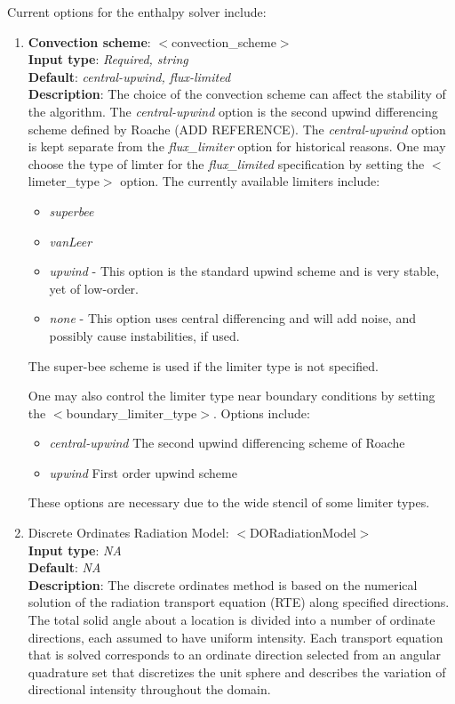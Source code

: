 Current options for the enthalpy solver include:
\begin{enumerate}
%
\item {\bf Convection scheme}: $<$convection\_scheme$>$ \\
{\bf Input type}: {\it Required, string} \\
{\bf Default}: {\it central-upwind, flux-limited } \\ 
{\bf Description}: The choice of the convection scheme can affect the stability of the algorithm.  The {\it central-upwind} option is the second upwind differencing scheme defined by Roache (ADD REFERENCE).  The {\it central-upwind} option is kept separate from the {\it flux\_limiter} option for historical reasons.  One may choose the type of limter for the {\it flux\_limited} specification by setting the  $<$limeter\_type$>$ option.  The currently available limiters include: 
\begin{itemize}
\item {\it superbee}
\item {\it vanLeer}
\item {\it upwind} - This option is the standard upwind scheme and is very stable, yet of low-order.
\item {\it none} - This option uses central differencing and will add noise, and possibly cause instabilities, if used. 
\end{itemize}
The super-bee scheme is used if the limiter type is not specified.  

One may also control the limiter type near boundary conditions by setting the $<$boundary\_limiter\_type$>$.  Options include:
\begin{itemize}
\item {\it central-upwind} The second upwind differencing scheme of Roache
\item {\it upwind} First order upwind scheme
\end{itemize}
These options are necessary due to the wide stencil of some limiter types. 
%
\item Discrete Ordinates Radiation Model: $<$DORadiationModel$>$ \\
{\bf Input type}: {\it NA} \\
{\bf Default}: {\it NA } \\ 
{\bf Description}: The discrete ordinates method is based on the numerical solution of the radiation transport equation (RTE) along specified directions. The total solid angle about a location is divided into a number of ordinate directions, each assumed to have uniform intensity. Each transport equation that is solved corresponds to an ordinate direction selected from an angular quadrature set that discretizes the unit sphere and describes the variation of directional intensity throughout the domain.


\end{enumerate}
